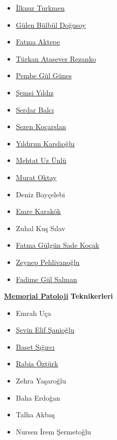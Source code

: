 \documentclass[
  letterpaper,
  DIV=11,
  numbers=noendperiod]{scrreprt}
\begin{document}
\begin{itemize}
\item
  \href{https://www.memorial.com.tr/en/doctors/ilknur-turkmen-1975}{İlknur
  Turkmen}
\item
  \href{https://www.memorial.com.tr/doktorlar/gulen-bulbul-dogusoy}{Gülen
  Bülbül Doğusoy}
\item
  \href{https://www.memorial.com.tr/doktorlar/fatma-aktepe}{Fatma
  Aktepe}
\item
  \href{https://www.memorial.com.tr/doktorlar/turkan-atasever-rezanko}{Türkan
  Atasever Rezanko}
\item
  \href{https://www.memorial.com.tr/doktorlar/pembe-gul-gunes}{Pembe Gül
  Güneş}
\item
  \href{https://www.memorial.com.tr/doktorlar/semsi-yildiz-1}{Şemsi
  Yıldız}
\item
  \href{https://www.memorial.com.tr/doktorlar/serdar-balci-k}{Serdar
  Balcı}
\item
  \href{https://www.memorial.com.tr/doktorlar/sezen-kocarslan}{Sezen
  Koçarslan}
\item
  \href{https://www.memorial.com.tr/doktorlar/yildirim-karslioglu-k}{Yıldırım
  Karslıoğlu}
\item
  \href{https://www.memorial.com.tr/doktorlar/mehtat-uz-unlu-k}{Mehtat
  Uz Ünlü}
\item
  \href{https://www.memorial.com.tr/doktorlar/murat-oktay}{Murat Oktay}
\item
  Deniz Bayçelebi
\item
  \href{https://www.memorial.com.tr/doktorlar/emre-karakok}{Emre
  Karakök}
\item
  Zuhal Kuş Sılav
\item
  \href{https://www.memorial.com.tr/doktorlar/fatma-gulgun-sade-kocak-k}{Fatma
  Gülgün Sade Koçak}
\item
  \href{https://www.memorial.com.tr/doktorlar/zeynep-pehlivanoglu-k}{Zeynep
  Pehlivanoğlu}
\item
  \href{https://www.memorial.com.tr/doktorlar/fadime-gul-salman}{Fadime
  Gül Salman}
\end{itemize}

\href{https://patoloji.memorial.com.tr/}{\textbf{Memorial Patoloji}}
\textbf{Teknikerleri}

\begin{itemize}
\item
  Emrah Uça
\item
  \href{https://www.linkedin.com/in/\%C5\%9Fevin-elif-\%C5\%9Fanio\%C4\%9Flu-99449a1b0/}{Şevin
  Elif Şanioğlu}
\item
  \href{https://www.linkedin.com/in/baset-s\%C4\%B1\%C4\%9F\%C4\%B1rc\%C4\%B1-aa2406141/}{Baset
  Sığırcı}
\item
  \href{https://www.linkedin.com/in/rabia-\%C3\%B6zt\%C3\%BCrk-4989b3151/}{Rabia
  Öztürk}
\item
  Zehra Yaşaroğlu
\item
  Baha Erdoğan
\item
  Talha Akbaş
\item
  Nursen İrem Şermetoğlu
\end{itemize}
\end{document}
